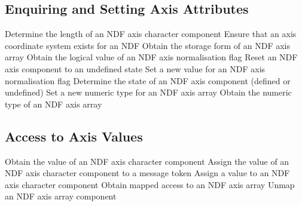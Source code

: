 \subsection{Enquiring and Setting Axis Attributes}

            {Determine the length of an NDF axis character component}
            {Ensure that an axis coordinate system exists for an NDF}
            {Obtain the storage form of an NDF axis array}
            {Obtain the logical value of an NDF axis normalisation flag}
            {Reset an NDF axis component to an undefined state}
            {Set a new value for an NDF axis normalisation flag}
            {Determine the state of an NDF axis component (defined or undefined)}
            {Set a new numeric type for an NDF axis array}
            {Obtain the numeric type of an NDF axis array}

\subsection{Access to Axis Values}

            {Obtain the value of an NDF axis character component}
            {Assign the value of an NDF axis character component to a message token}
            {Assign a value to an NDF axis character component}
            {Obtain mapped access to an NDF axis array}
            {Unmap an NDF axis array component}

